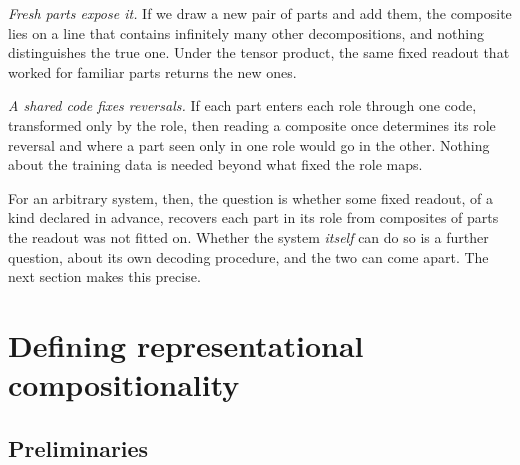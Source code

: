 \documentclass[10pt]{article}
\theoremstyle{plain}
\theoremstyle{remark}
\begin{document}
\emph{Fresh parts expose it.} If we draw a new pair of parts and add them, the composite lies on a line that contains infinitely many other decompositions, and nothing distinguishes the true one. Under the tensor product, the same fixed readout that worked for familiar parts returns the new ones.

\emph{A shared code fixes reversals.} If each part enters each role through one code, transformed only by the role, then reading a composite once determines its role reversal and where a part seen only in one role would go in the other. Nothing about the training data is needed beyond what fixed the role maps.

For an arbitrary system, then, the question is whether some fixed readout, of a kind declared in advance, recovers each part in its role from composites of parts the readout was not fitted on. Whether the system \emph{itself} can do so is a further question, about its own decoding procedure, and the two can come apart. The next section makes this precise.

\section{Defining representational compositionality}
\label{sec:definition}

\subsection{Preliminaries}
\end{document}
